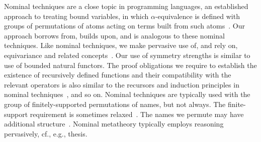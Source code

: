 Nominal techniques are a close topic in programming languages, an
established approach to treating bound variables, in which
$\alpha$-equivalence is defined with groups of permutations of atoms acting on terms built from such
atoms~\cite{DBLP:journals/iandc/Pitts03,pitts:nominal-sets-book,DBLP:journals/siglog/Pitts16}.
Our approach borrows from, builds upon, and is analogous to these
nominal techniques. Like nominal techniques, we make pervasive use of, and
rely on, equivariance and related concepts~\cite{pitts:nominal-sets-book}.
Our use of symmetry strengths is similar to  use of bounded natural functors.
The proof obligations we
require to establish the existence of recursively defined functions
and their compatibility with the relevant operators is also similar to
the recursors and induction principles in nominal techniques~\cite{%
  gabbay-pitts:a-new-approach-to-abstract-syntax-with-variable-binding,%
  norrish:recursive-function-definition-for-types-with-binders,%
  pitts:alpha-structural-recursion-and-induction,%
  urban-berghofer:a-recursion-combinator-for-nominal-datatypes-implemented-in-isabelle-hol,%
  blanchette-et-al:bindings-as-bounded-natural-functors,%
  popescu:nominal-recursors-as-epi-recursors,%
  popescu-gunter:recursion-principles-for-syntax-with-bindings-and-substitution%
}, and so on. Nominal techniques are typically used
with the group of finitely-supported permutations of names, but not always. The
finite-support requirement is sometimes relaxed~\cite{blanchette-et-al:bindings-as-bounded-natural-functors,
dowek-gabbay-mulligan:permissive-nominal-terms-and-their-unification,
cheney:nominal-logic-programming}.
The names we permute may have additional structure~\cite{bojanczyk-klin-lasota:automata-with-group-actions}.
Nominal metatheory typically employs \WLOG{} reasoning pervasively, cf., e.g.,  thesis.

